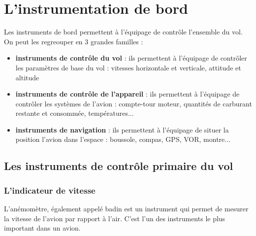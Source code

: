 

\section{L'instrumentation de bord}
	Les instruments de bord permettent à l'équipage de contrôle l'ensemble du vol. On peut les regreouper en 3 grandes familles :
	\begin{itemize}
		\item \textbf{instruments de contrôle du vol} : ils permettent à l'équipage de contrôler les paramètres de base du vol : vitesses horizontale et verticale, attitude et altitude
		\item \textbf{instruments de contrôle de l'appareil} : ils permettent à l'équipage de contrôler les systèmes de l'avion : compte-tour moteur, quantités de carburant restante et consommée, températures...
		\item \textbf{instruments de navigation} : ils permettent à l'équipage de situer la position l'avion dans l'espace : boussole, compas, GPS, VOR, montre...
	\end{itemize}
	
	\subsection{Les instruments de contrôle primaire du vol}
	\subsubsection{L'indicateur de vitesse}
	 L'\gls{anémomètre}, également appelé \gls{badin} est un instrument qui permet de mesurer la vitesse de l'avion par rapport à l'air. C'est l'un des instruments le plus important dans un avion. 

	\begin{figure}[H]	
	\centering
	\end{figure}
	
